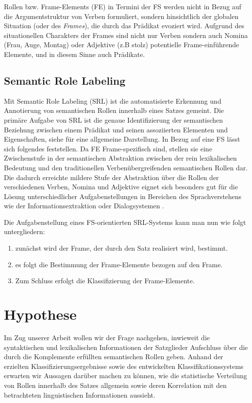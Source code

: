 \documentclass[12pt]{article}
\begin{document}
Rollen bzw. Frame-Elements (FE) in Termini der FS werden nicht in Bezug auf die
Argumentstruktur von Verben formuliert, sondern hinsichtlich der globalen
Situation (oder des \textit{Frames}), die durch das Prädikat evoziert wird. Aufgrund
des situationellen Charakters der Frames sind nicht nur Verben sondern auch
Nomina (Frau, Auge, Montag) oder Adjektive (z.B stolz) potentielle
Frame-einführende Elemente, und in diesem Sinne auch Prädikate.

\subsection{Semantic Role Labeling}

Mit Semantic Role Labeling (SRL) ist die automatisierte Erkennung und
Annotierung von semantischen Rollen innerhalb eines Satzes gemeint. Die primäre
Aufgabe von SRL ist die genaue Identifizierung der semantischen Beziehung
zwischen einem Prädikat und seinen assoziierten Elementen und Eigenschaften,
siehe \cite{SRL2008} für eine allgemeine Darstellung. In Bezug auf eine FS lässt
sich folgendes feststellen. Da FE Frame-spezifisch sind, stellen sie eine
Zwischenstufe in der semantischen Abstraktion zwischen der rein lexikalischen
Bedeutung und den traditionellen Verbenübergreifenden semantischen Rollen dar.
Die dadurch erreichte \glqq{}mildere\grqq{} Stufe der Abstraktion über die
Rollen der verschiedenen Verben, Nomina und Adjektive eignet sich besonders gut
für die Lösung unterschiedlicher Aufgabenstellungen in Bereichen des
Sprachverstehens wie der Informationsextraktion oder Dialogsystemen
\cite{gildea}.

Die Aufgabenstellung eines FS-orientierten SRL-Systems kann man nun 
wie folgt untergliedern:
\begin{enumerate}
\item zunächst wird der Frame, der durch den Satz realisiert wird, bestimmt.
\item es folgt die Bestimmung der Frame-Elemente bezogen auf den Frame. 
\item Zum Schluss erfolgt die Klassifizierung der Frame-Elemente.
\end{enumerate}

\section{Hypothese}

Im Zug unserer Arbeit wollen wir der Frage nachgehen, inwieweit die
syntaktischen und lexikalischen Informationen der Satzglieder Aufschluss über
die durch die Komplemente erfüllten semantischen Rollen geben. Anhand der
erzielten Klassifizierungsergebnisse sowie des entwickelten
Klassifikationssystems erwarten wir Aussagen darüber machen zu können, wie die
statistische Verteilung von Rollen innerhalb des Satzes allgemein sowie deren
Korrelation mit den betrachteten linguistischen Informationen aussieht.
\end{document}
